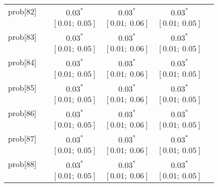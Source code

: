 \begin{table}
\begin{center}
\begin{tabular}{l c c c c c }
prob[82]    &                                  & $0.03^{*}$                & $0.03^{*}$                & $0.03^{*}$              &                         \\
            &                                  & $[0.01;\ 0.05]$           & $[0.01;\ 0.06]$           & $[0.01;\ 0.05]$         &                         \\
prob[83]    &                                  & $0.03^{*}$                & $0.03^{*}$                & $0.03^{*}$              &                         \\
            &                                  & $[0.01;\ 0.05]$           & $[0.01;\ 0.06]$           & $[0.01;\ 0.05]$         &                         \\
prob[84]    &                                  & $0.03^{*}$                & $0.03^{*}$                & $0.03^{*}$              &                         \\
            &                                  & $[0.01;\ 0.05]$           & $[0.01;\ 0.06]$           & $[0.01;\ 0.05]$         &                         \\
prob[85]    &                                  & $0.03^{*}$                & $0.03^{*}$                & $0.03^{*}$              &                         \\
            &                                  & $[0.01;\ 0.05]$           & $[0.01;\ 0.06]$           & $[0.01;\ 0.05]$         &                         \\
prob[86]    &                                  & $0.03^{*}$                & $0.03^{*}$                & $0.03^{*}$              &                         \\
            &                                  & $[0.01;\ 0.05]$           & $[0.01;\ 0.06]$           & $[0.01;\ 0.05]$         &                         \\
prob[87]    &                                  & $0.03^{*}$                & $0.03^{*}$                & $0.03^{*}$              &                         \\
            &                                  & $[0.01;\ 0.05]$           & $[0.01;\ 0.06]$           & $[0.01;\ 0.05]$         &                         \\
prob[88]    &                                  & $0.03^{*}$                & $0.03^{*}$                & $0.03^{*}$              &                         \\
            &                                  & $[0.01;\ 0.05]$           & $[0.01;\ 0.06]$           & $[0.01;\ 0.05]$         &                         \\

\end{tabular}
\end{center}
\end{table}
